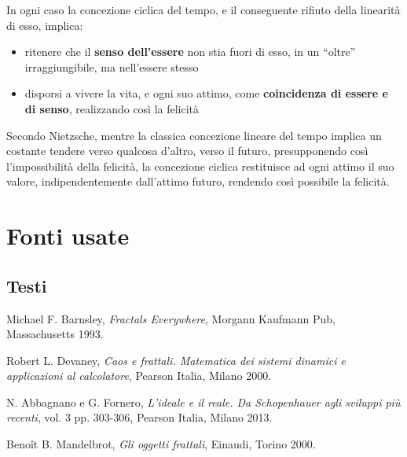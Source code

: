 \documentclass[10pt]{report}
\begin{document}
		In ogni caso la concezione ciclica del tempo, e il conseguente rifiuto della linearità di esso, implica:
		\begin{itemize}
			\item ritenere che il \textbf{senso dell'essere} non stia fuori di esso, in un ``oltre'' irraggiungibile, ma nell'essere stesso
			\item disporsi a vivere la vita, e ogni suo attimo, come \textbf{coincidenza di essere e di senso}, realizzando così la felicità
		\end{itemize}
		Secondo Nietzsche, mentre la classica concezione lineare del tempo implica un costante tendere verso qualcosa d'altro, verso il futuro, presupponendo così l'impossibilità della felicità, la concezione ciclica restituisce ad ogni attimo il suo valore, indipendentemente dall'attimo futuro, rendendo così possibile la felicità.
		
		

		\newpage
		\chapter{Fonti usate}
			\section{Testi}
				\begin{enumerate}[label={[\arabic*]}]
					\item Michael F. Barnsley, \textit{Fractals Everywhere}, Morgann Kaufmann Pub, Massachusetts 1993.
					\item Robert L. Devaney, \textit{Caos e frattali. Matematica dei sistemi dinamici e applicazioni al calcolatore}, Pearson Italia, Milano 2000.
					\item N. Abbagnano e G. Fornero, \textit{L'ideale e il reale. Da Schopenhauer agli sviluppi più recenti}, vol. 3 pp. 303-306, Pearson Italia, Milano 2013.
					\item Benoît B. Mandelbrot, \textit{Gli oggetti frattali}, Einaudi, Torino 2000.
				\end{enumerate}
\end{document}

